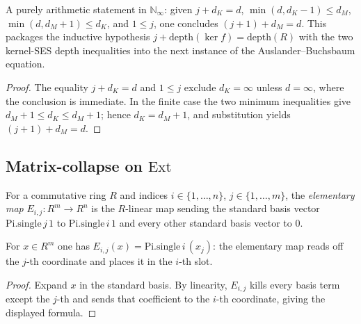 \begin{lemma}\label{mk-lem:enat_ab_inductive_combine}
  \leanok

  A purely arithmetic statement in \(\mathbb N_\infty\): given \(j + d_K = d\),
  \(\min(d, d_K - 1) \leq d_M\), \(\min(d, d_M + 1) \leq d_K\), and \(1 \leq j\), one
  concludes \((j + 1) + d_M = d\). This packages the inductive hypothesis
  \(j + \text{depth}(\ker f) = \text{depth}(R)\) with the two kernel-SES depth
  inequalities into the next instance of the Auslander--Buchsbaum equation.
\end{lemma}
\begin{proof}
  \leanok

The equality \(j+d_K=d\) and \(1\leq j\) exclude \(d_K=\infty\)
  unless \(d=\infty\), where the conclusion is immediate. In the finite
  case the two minimum inequalities give
  \(d_M+1\leq d_K\leq d_M+1\); hence \(d_K=d_M+1\), and substitution yields
  \((j+1)+d_M=d\).
\end{proof}

\subsection{Matrix-collapse on \texorpdfstring{\(\text{Ext}\)}{Ext}}
\label{mk-subsec:ab_matrix_collapse_substrate}

\begin{definition}\label{mk-def:elemMap}
  \leanok

  For a commutative ring \(R\) and indices \(i \in \{1, \dots, n\}\),
  \(j \in \{1, \dots, m\}\), the \emph{elementary map} \(E_{i,j} : R^m \to R^n\) is the
  \(R\)-linear map sending the standard basis vector \(\text{Pi.single}\,j\,1\) to
  \(\text{Pi.single}\,i\,1\) and every other standard basis vector to \(0\).
\end{definition}

\begin{lemma}\label{mk-lem:elemMap_apply}
  \leanok

  For \(x \in R^m\) one has \(E_{i,j}(x) = \text{Pi.single}\,i\,(x_j)\): the elementary
  map reads off the \(j\)-th coordinate and places it in the \(i\)-th slot.
\end{lemma}
\begin{proof}
  \leanok

Expand \(x\) in the standard basis. By linearity, \(E_{i,j}\)
  kills every basis term except the \(j\)-th and sends that coefficient to
  the \(i\)-th coordinate, giving the displayed formula.
\end{proof}

